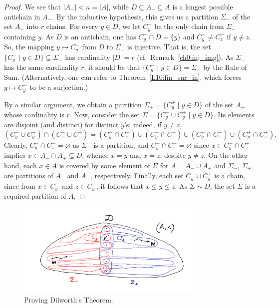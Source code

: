 \documentclass[12pt,notitlepage]{article}
\theoremstyle{plain}
\theoremstyle{definition}
\theoremstyle{plain}
\newcommand{\sbs}{\subseteq}
\newcommand{\void}{\varnothing}
\newcommand{\1}{\mathbf{1}}
\newcommand{\0}{\mathbf{0}}
\begin{document}
\begin{proof}
We see that $|A_{-}| < n = |A|$, while $D \sbs A_{-} \sbs A$ is a longest possible antichain in $A_{-}$. By the inductive hypothesis, this gives us a partition $\Sigma_{-}$ of the set $A_{-}$ into $r$ chains. For every $y \in D$, we let $C_y^{-}$ be the only chain from $\Sigma_{-}$ containing $y$. As $D$ is an antichain, one has $C^{-}_y \cap D = \{ y \}$ and $C^{-}_y \neq C^{-}_z$ if $y \neq z$. So, the mapping $y \mapsto C^{-}_y$ from $D$ to $\Sigma_{-}$ is injective. That is, the set $\{ C^-_y  \mid y \in D \} \sbs \Sigma_{-}$ has cardinality $|D| = r$ (cf.~Remark~\ref{ch0:inj_img}). As $\Sigma_{-}$ has the same cardinality $r$, it should be that $\{ C^-_y  \mid y \in D \} = \Sigma_{-}$ by the Rule of Sum. (Alternatively, one can refer to Theorem~\ref{L10:fin_sur_in}, which forces $y \mapsto C^{-}_y$ to be a surjection.)

By a similar argument, we obtain a partition $\Sigma_{+} = \{ C^+_y  \mid y \in D \}$ of the set $A_{+}$ whose cardinality is $r$. Now, consider the set $\Sigma = \{ C^-_y \cup C^+_y \mid y \in D \}$. Its elements  are disjoint (and distinct) for distinct $y$'s: indeed, if $y \neq z$,
$$(C^-_y \cup C^+_y) \cap (C^-_z \cup C^+_z) = (C^-_y \cap C^-_z) \cup (C^-_y \cap C^+_z) \cup (C^+_y \cap C^-_z) \cup (C^+_y \cap C^+_z).$$
Clearly, $C^-_y \cap C^-_z = \void$ as $\Sigma_-$ is a partition, and $C^-_y \cap C^+_z = \void$ since $x \in C^-_y \cap C^+_z$ implies $x \in A_- \cap A_+ \sbs D$, whence $x = y$ and $x = z$, despite $y \neq z$. On the other hand, each $x \in A$ is covered by some element of $\Sigma$ for $A = A_{-} \cup A_{+}$ and $\Sigma_-$, $\Sigma_+$ are partitions of $A_{-}$ and $A_{+}$, respectively. Finally, each set $C^-_y \cup C^+_y$ is a chain, since from $x \in C^-_y$ and $z \in C^+_y$, it follows that $x \leq y \leq z$.  As $\Sigma \sim D$, the set $\Sigma$ is a required partition of $A$.
\end{proof}

\begin{figure}[h]
\centering
\includegraphics*[width=0.8\textwidth]{dilworth.pdf}
\caption{Proving Dilworth's Theorem.}
\end{figure}
\end{document}
